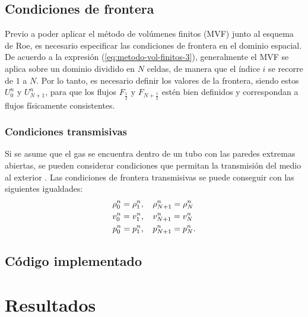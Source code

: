 \subsection{Condiciones de frontera}
Previo a poder aplicar el método de volúmenes finitos (MVF) junto al esquema de Roe, es necesario especificar las condiciones de frontera en el dominio espacial.
De acuerdo a la expresión (\ref{eq:metodo-vol-finitos-3}), generalmente el MVF se aplica sobre un dominio dividido en $N$ celdas, de manera que el índice $i$ se recorre de $1$ a $N$. Por lo tanto, es necesario definir los valores de la frontera, siendo estos $U_{0}^{n}$ y $U_{N+1}^{n}$, para que los flujos $F_{\frac{1}{2}}$ y $F_{N+\frac{1}{2}}$ estén bien definidos y correspondan a flujos físicamente consistentes.
\subsubsection{Condiciones transmisivas}
Si se asume que el gas se encuentra dentro de un tubo con las paredes extremas abiertas, se pueden considerar condiciones que permitan la transmisión del medio al exterior \cite{thesis-euler-godunov}. Las condiciones de frontera transmisivas se puede conseguir con las siguientes igualdades:
\begin{align}
	\rho_{0}^{n} = \rho_{1}^{n}, \hspace{4mm}&
	\rho_{N+1}^{n} = \rho_{N}^{n} \\
	v_{0}^{n} = v_{1}^{n}, \hspace{4mm}&
	v_{N+1}^{n} = v_{N}^{n} \\
	p_{0}^{n} = p_{1}^{n}, \hspace{4mm}&
	p_{N+1}^{n} = p_{N}^{n}.
\end{align}
\subsection{Código implementado}
\section{Resultados}
